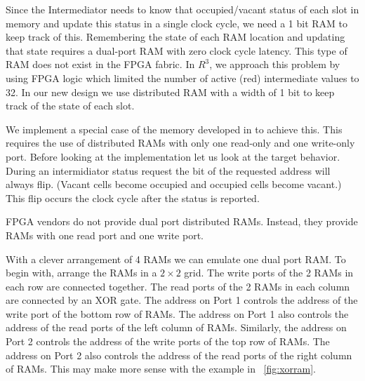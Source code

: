 \par Since the Intermediator needs to know that occupied/vacant status of each slot in memory and update this status in a single clock cycle, we need a 1 bit RAM to keep track of this. Remembering the state of each RAM location and updating that state requires a dual-port RAM with zero clock cycle latency. This type of RAM does not exist in the FPGA fabric. In $R^3$, we approach this problem by using FPGA logic which limited the number of active (red) intermediate values to 32. In our new design we use distributed RAM with a width of 1 bit to keep track of the state of each slot.

We implement a special case of the memory developed in \cite{prelim:laforest2} to achieve this. This requires the use of distributed RAMs with only one read-only and one write-only port. Before looking at the implementation let us look at the target behavior. During an intermidiator status request the bit of  the requested address will always flip. (Vacant cells become occupied and occupied cells become vacant.) This flip occurs the clock cycle after the status is reported.\par
FPGA vendors do not provide dual port distributed RAMs. Instead, they provide RAMs with one read port and one write port. \par
With a clever arrangement of 4 RAMs we can emulate one dual port RAM. To begin with, arrange the RAMs in a $2\times 2$ grid. The write ports of the 2 RAMs in each row are connected together. The read ports of the 2 RAMs in each column are connected by an XOR gate. The address on Port 1 controls the address of the write port of the bottom row of RAMs. The address on Port 1 also controls the address of the read ports of the left column of RAMs. Similarly, the address on Port 2 controls the address of the write ports of the top row of RAMs. The address on Port 2 also controls the address of the read ports of the right column of RAMs. This may make more sense with the example in \figurename~\ref{fig:xorram}. \par
